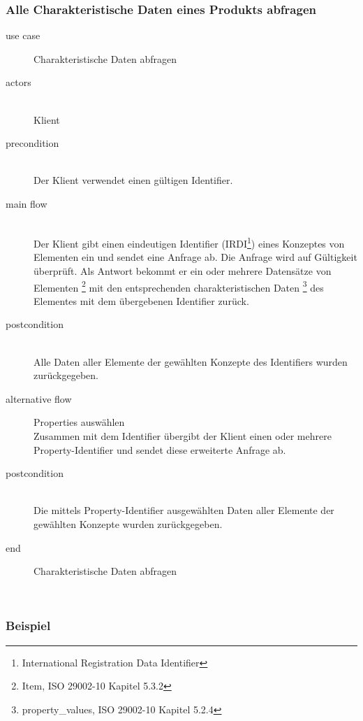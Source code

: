 \subsubsection{Alle Charakteristische Daten eines Produkts abfragen}

{\small

\begin{description}
     \item[use case] Charakteristische Daten abfragen
     \item[  actors]~\\
     Klient
     \item[  precondition]~\\
     Der Klient verwendet einen gültigen Identifier.
     \item[  main flow]~\\
     Der Klient gibt einen eindeutigen Identifier (\gls{IRDI}\footnote{International Registration Data Identifier}) eines Konzeptes von Elementen ein und sendet eine Anfrage ab. Die Anfrage wird auf Gültigkeit überprüft. Als Antwort bekommt er ein oder mehrere Datensätze von Elementen \footnote{Item, ISO 29002-10 Kapitel 5.3.2} mit den entsprechenden charakteristischen Daten \footnote{property\_values, ISO 29002-10 Kapitel 5.2.4}  des Elementes mit dem übergebenen Identifier zurück.
     \item[  postcondition]~\\
     Alle Daten aller Elemente der gewählten Konzepte des Identifiers wurden zurückgegeben.    
     \item[  alternative flow] Properties auswählen ~\\
     Zusammen mit dem Identifier übergibt der Klient einen oder mehrere Property-Identifier und sendet diese erweiterte Anfrage ab.    
     \item[  postcondition]~\\
     Die mittels Property-Identifier ausgewählten Daten aller Elemente der gewählten Konzepte wurden zurückgegeben.    
     \item[end] Charakteristische Daten abfragen
\end{description}

~\\

} %

\subsubsection{Beispiel}\label{lab:schraubendreher}

